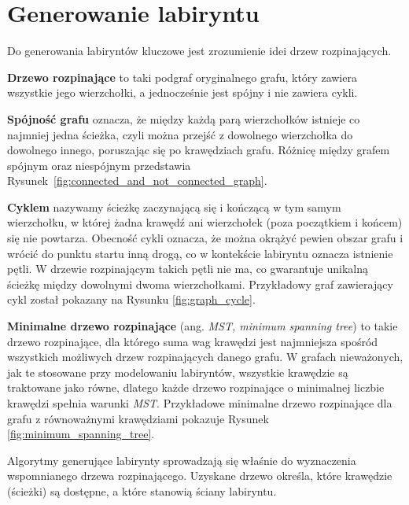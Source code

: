 \section{Generowanie labiryntu}

Do generowania labiryntów kluczowe jest zrozumienie idei drzew rozpinających.

\textbf{Drzewo rozpinające} \cite{cormen2009} to taki podgraf oryginalnego grafu, który zawiera wszystkie jego wierzchołki, a jednocześnie jest spójny i nie zawiera cykli. 

\textbf{Spójność grafu} \cite{balakrishnan2005} oznacza, że między każdą parą wierzchołków istnieje co najmniej jedna ścieżka, czyli można przejść z dowolnego wierzchołka do dowolnego innego, poruszając się po krawędziach grafu. Różnicę między grafem spójnym oraz niespójnym przedstawia Rysunek~\ref{fig:connected_and_not_connected_graph}.



\textbf{Cyklem} \cite{balakrishnan2005} nazywamy ścieżkę zaczynającą się i kończącą w tym samym wierzchołku, w której żadna krawędź ani wierzchołek (poza początkiem i końcem) się nie powtarza. Obecność cykli oznacza, że można okrążyć pewien obszar grafu i wrócić do punktu startu inną drogą, co w kontekście labiryntu oznacza istnienie pętli. W drzewie rozpinającym takich pętli nie ma, co gwarantuje unikalną ścieżkę między dowolnymi dwoma wierzchołkami. Przykładowy graf zawierający cykl został pokazany na Rysunku \ref{fig:graph_cycle}.



\textbf{Minimalne drzewo rozpinające} \cite{cormen2009} (ang. \textit{MST, minimum spanning tree}) to takie drzewo rozpinające, dla którego suma wag krawędzi jest najmniejsza spośród wszystkich możliwych drzew rozpinających danego grafu. W grafach nieważonych, jak te stosowane przy modelowaniu labiryntów, wszystkie krawędzie są traktowane jako równe, dlatego każde drzewo rozpinające o minimalnej liczbie krawędzi spełnia warunki \textit{MST}. Przykładowe minimalne drzewo rozpinające dla grafu z równoważnymi krawędziami pokazuje Rysunek \ref{fig:minimum_spanning_tree}.



Algorytmy generujące labirynty sprowadzają się właśnie do wyznaczenia wspomnianego drzewa rozpinającego. 
Uzyskane drzewo określa, które krawędzie (ścieżki) są dostępne, a które stanowią ściany labiryntu.



